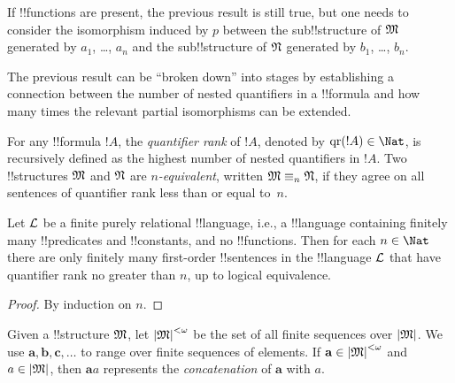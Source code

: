 \documentclass[../../../include/open-logic-section]{subfiles}
\begin{document}
\begin{rem}
If !!{function}s are present, the previous result is still true, but
one needs to consider the isomorphism induced by $p$ between the
sub!!{structure} of $\mathfrak M$ generated by $a_1$, \dots, $a_n$ and the
sub!!{structure} of $\mathfrak N$ generated by $b_1$, \dots, $b_n$.
\end{rem}

The previous result can be ``broken down'' into stages by establishing a
connection between the number of nested quantifiers in a !!{formula} and
how many times the relevant partial isomorphisms can be extended.

\begin{defn}
  For any !!{formula} $!A$, the \emph{quantifier rank} of $!A$, denoted
  by $\QuantRank{!A} \in \Nat$, is recursively defined as
  the highest number of nested quantifiers in $!A$.  Two
  !!{structure}s $\mathfrak M$ and $\mathfrak N$ are \emph{$n$-equivalent},
  written $\Struct{M} \elemequiv[n] \Struct{N}$, if they agree on all
  sentences of quantifier rank less than or equal to~$n$.
\end{defn}

\begin{prop}
  Let $\mathcal L$ be a finite purely relational !!{language}, i.e., a
  !!{language} containing finitely many !!{predicate}s and !!{constant}s,
  and no !!{function}s. Then for each $n \in \Nat$ there are
  only finitely many first-order !!{sentence}s in the !!{language}
  $\mathcal L$ that have quantifier rank no greater than $n$, up to
  logical equivalence.
\end{prop}

\begin{proof}
  By induction on $n$.
\end{proof}

\begin{defn}
  Given a !!{structure} $\mathfrak M$, let $\left| \mathfrak M \right|^{<\omega}$ be the set of
  all finite sequences over $\left| \mathfrak M \right|$. We use $\mathbf{a},
  \mathbf{b}, \mathbf{c}, \ldots$ to range over finite sequences of
  elements. If $\mathbf{a} \in \left| \mathfrak M \right|^{<\omega}$ and $a \in \left| \mathfrak M \right|$, then
  $\mathbf{a}a$ represents the \emph{concatenation} of $\mathbf{a}$ with $a$.
\end{defn}
\end{document}
